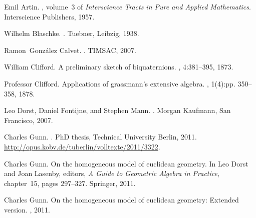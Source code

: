 \documentclass{birkjour}
\newcommand{\gTh}{\cite{gunnThesis}\xspace}
\begin{document}
\vspace{-.15in}
%
%

\begin{thebibliography}{Gun16b}

Emil Artin.
, volume~3 of {\em Interscience Tracts in Pure
  and Applied Mathematics}.
\newblock Interscience Publishers, 1957.

Wilhelm Blaschke.
.
\newblock Tuebner, Leibzig, 1938.

Ramon~Gonz\'{a}lez Calvet.
.
\newblock TIMSAC, 2007.

William Clifford.
\newblock A preliminary sketch of biquaternions.
, 4:381--395, 1873.

Professor Clifford.
\newblock Applications of grassmann's extensive algebra.
, 1(4):pp. 350--358, 1878.

Leo Dorst, Daniel Fontijne, and Stephen Mann.
.
\newblock Morgan Kaufmann, San Francisco, 2007.

Charles Gunn.
.
\newblock PhD thesis, Technical University Berlin, 2011.
\newblock \url{http://opus.kobv.de/tuberlin/volltexte/2011/3322}.

Charles Gunn.
\newblock On the homogeneous model of euclidean geometry.
\newblock In Leo Dorst and Joan Lasenby, editors, {\em A Guide to Geometric
  Algebra in Practice}, chapter~15, pages 297--327. Springer, 2011.

Charles Gunn.
\newblock On the homogeneous model of euclidean geometry: Extended version.
, 2011.


\end{thebibliography}
\end{document}
